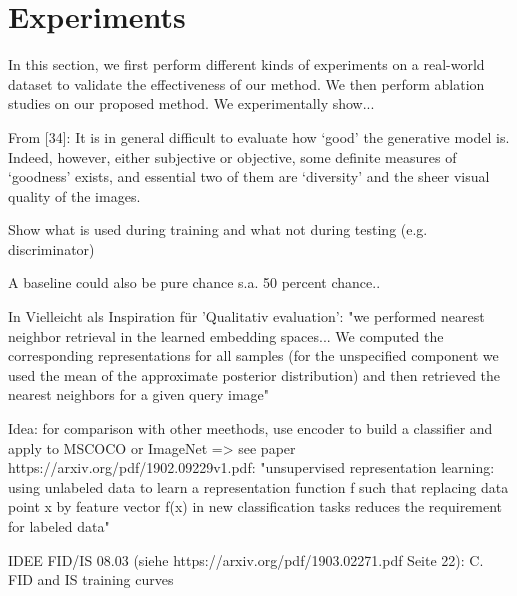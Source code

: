 \documentclass[12pt,a4paper]{article}
\begin{document}
\section{Experiments}
In this section, we first perform different kinds of experiments on a real-world dataset to validate the
effectiveness of our method. We then perform ablation studies on our proposed
method. 
We experimentally show...


From [34]: It is in general difficult to evaluate how ‘good’ the generative model is. Indeed, however, either subjective or objective, some definite measures of ‘goodness’ exists, and essential two of them are ‘diversity’ and the sheer visual quality of the images.

\par Show what is used during training and what not during testing (e.g. discriminator)
    
\par A baseline could also be pure chance s.a. 50 percent chance..

\par In \cite{1611.03383} Vielleicht als Inspiration für 'Qualitativ evaluation': "we performed nearest neighbor retrieval in the learned embedding spaces... We computed the corresponding representations for all samples (for the unspecified component we used the mean of the approximate posterior distribution) and then retrieved the nearest neighbors for a given query image"

\par Idea: for comparison with other meethods, use encoder to build a classifier and apply to MSCOCO or ImageNet => see paper https://arxiv.org/pdf/1902.09229v1.pdf: "unsupervised representation learning: using unlabeled data to learn a representation function f such that replacing data point x by feature vector f(x) in new classification tasks reduces the requirement for labeled data"

\par IDEE FID/IS 08.03 (siehe https://arxiv.org/pdf/1903.02271.pdf Seite 22): C. FID and IS training curves
    
\end{document}
